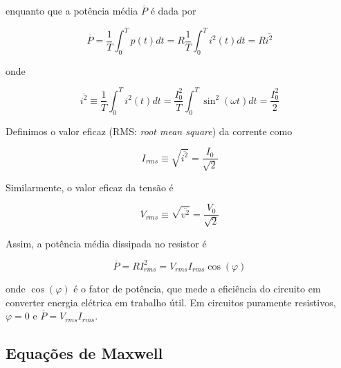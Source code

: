 \documentclass[12pt]{article}
\begin{document}
\noindent enquanto que a potência média \(\overline{P}\) é dada por

\begin{equation}
    \overline{P} = \frac{1}{T} \int_0^T p(t) dt = R \frac{1}{T} \int_0^T i^2(t) dt = R\overline{i^2}
\end{equation}

\noindent onde 

\begin{equation}
    \overline{i^2} \equiv \frac{1}{T} \int_0^T i^2(t) dt = \frac{I_0^2}{T} \int_0^T \sin^2(\omega t) dt = \frac{I_0^2}{2}
\end{equation}

Definimos o valor eficaz (RMS: \emph{root mean square}) da corrente como

\begin{equation}
    \boxed{I_{rms} \equiv \sqrt{\overline{i^2}} = \frac{I_0}{\sqrt{2}}}
\end{equation}

Similarmente, o valor eficaz da tensão é

\begin{equation}
    \boxed{V_{rms} \equiv \sqrt{\overline{v^2}} = \frac{V_0}{\sqrt{2}}}
\end{equation}

Assim, a potência média dissipada no resistor é

\begin{equation}
    \boxed{\overline{P} = R I_{rms}^2 = V_{rms} I_{rms} \cos(\varphi)}
\end{equation}

\noindent onde \(\cos(\varphi)\) é o fator de potência, que mede a eficiência do circuito em converter energia elétrica em trabalho útil. Em circuitos puramente resistivos, \(\varphi = 0\) e \(\overline{P} = V_{rms} I_{rms}\).

\subsection{Equações de Maxwell}
\end{document}
